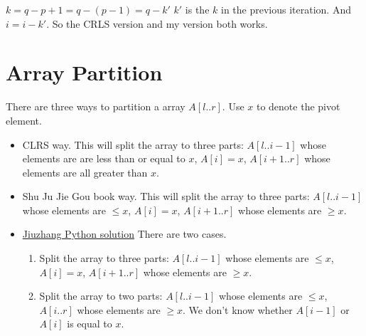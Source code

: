 \documentclass{book}
\begin{document}
$k = q - p +  1= q - (p - 1) = q - k'$ $k'$ is the $k$ in the previous
iteration. And $i = i - k'$. So the CRLS version and my version both works.

\section{Array Partition}
There are three ways to partition a array $A[l..r]$. Use $x$ to denote the pivot
element.

\begin{itemize}
  \item CLRS way. This will split the array to three parts: $A[l..i-1]$ whose
    elements are are less than or equal to $x$, $A[i] = x$, $A[i+1..r]$ whose
    elements are all greater than $x$.
  \item Shu Ju Jie Gou book way. This will split the array to three parts: $A[l..i-1]$ whose
    elements are $\le x$, $A[i] = x$, $A[i+1..r]$ whose
    elements are $\ge x$.
  \item \href{https://www.jiuzhang.com/solution/kth-largest-element/#tag-highlight-lang-python}{Jiuzhang Python solution}
    There are two cases.
    \begin{enumerate}
      \item Split the array to three parts: $A[l..i-1]$ whose
        elements are $\le x$, $A[i] = x$, $A[i+1..r]$ whose
        elements are $\ge x$.
      \item Split the array to two parts: $A[l..i-1]$ whose
        elements are $\le x$, $A[i..r]$ whose
        elements are $\ge x$. We don't know whether $A[i-1]$ or $A[i]$ is equal to $x$.
    \end{enumerate}
\end{itemize}
\end{document}
